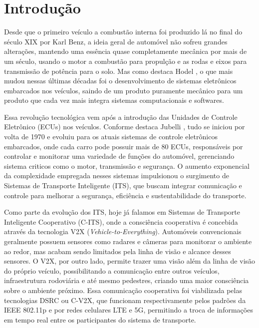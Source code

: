 \chapter{Introdução}

Desde que o primeiro veículo a combustão interna foi produzido lá no final do século XIX por Karl Benz, a ideia geral de automóvel não sofreu grandes alterações,
mantendo uma essência quase completamente mecânica por mais de um século, usando o motor a combustão para propulção e as rodas e eixos para transmissão de potência
para o solo. Mas como destaca Hodel \cite{ref:hodel}, o que mais mudou nessas últimas décadas foi o desenvolvimento de sistemas eletrônicos embarcados nos veículos,
saindo de um produto puramente mecânico para um produto que cada vez mais integra sistemas computacionais e softwares.

Essa revolução tecnológica vem após a introdução das Unidades de Controle Eletrônico (ECUs) nos veículos. Conforme destaca Jubelli \cite{ref:jubelli}, tudo se
iniciou por volta de 1970 e evoluiu para os atuais sistemas de controle eletrônicos embarcados, onde cada carro pode possuir mais de 80 ECUs, responsáveis por
controlar e monitorar uma variedade de funções do automóvel, gerenciando sistema criticos como o motor, transmissão e segurança. O aumento exponencial da
complexidade empregada nesses sistemas impulsionou o surgimento de Sistemas de Transporte Inteligente (ITS), que buscam integrar comunicação e controle para
melhorar a segurança, eficiência e sustentabilidade do transporte.

Como parte da evolução dos ITS, hoje já falamos em Sistemas de Transporte Inteligente Cooperativo (C-ITS), onde a consciência cooperativa é concebida através da
tecnologia V2X (\textit{Vehicle-to-Everything}). Automóveis convencionais geralmente possuem sensores como radares e câmeras para monitorar o ambiente ao redor,
mas acabam sendo limitados pela linha de visão e alcance desses sensores. O V2X, por outro lado, permite trazer uma visão além da linha de visão do próprio veículo,
possibilitando a comunicação entre outros veículos, infraestrutura rodoviária e até mesmo pedestres, criando uma maior consciência sobre o ambiente próximo. Essa
comunicação cooperativa foi viabilizada pelas tecnologias DSRC ou C-V2X, que funcionam respectivamente pelos padrões da IEEE 802.11p e por redes celulares LTE e 5G,
permitindo a troca de informações em tempo real entre os participantes do sistema de transporte.

